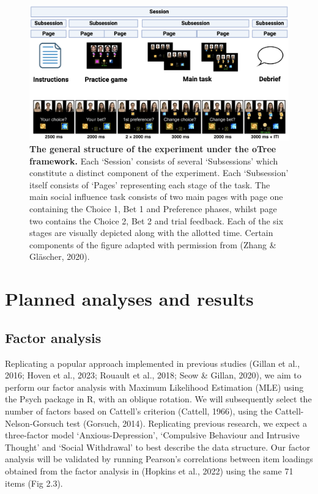 \documentclass[12pt,a4paper,oneside,]{book} %
\begin{document}
\begin{figure}
\includegraphics[width=1\linewidth]{figures/otree_experiment} \caption{{\textbf{The general structure of the experiment under the oTree framework.} Each `Session' consists of several `Subsessions' which constitute a distinct component of the experiment. Each `Subsession' itself consists of `Pages' representing each stage of the task. The main social influence task consists of two main pages with page one containing the Choice 1, Bet 1 and Preference phases, whilst page two contains the Choice 2, Bet 2 and trial feedback. Each of the six stages are visually depicted along with the allotted time. Certain components of the figure adapted with permission from (Zhang \& Gläscher, 2020).}}\label{fig:figure-2-otree}
\end{figure}



\section{Planned analyses and results}\label{planned-analyses-and-results}

\subsection{Factor analysis}\label{factor-analysis}

Replicating a popular approach implemented in previous studies (Gillan et al., 2016; Hoven et al., 2023; Rouault et al., 2018; Seow \& Gillan, 2020), we aim to perform our factor analysis with Maximum Likelihood Estimation (MLE) using the Psych package in R, with an oblique rotation. We will subsequently select the number of factors based on Cattell's criterion (Cattell, 1966), using the Cattell-Nelson-Gorsuch test (Gorsuch, 2014). Replicating previous research, we expect a three-factor model `Anxious-Depression', `Compulsive Behaviour and Intrusive Thought' and `Social Withdrawal' to best describe the data structure. Our factor analysis will be validated by running Pearson's correlations between item loadings obtained from the factor analysis in (Hopkins et al., 2022) using the same 71 items (Fig 2.3).
\end{document}

